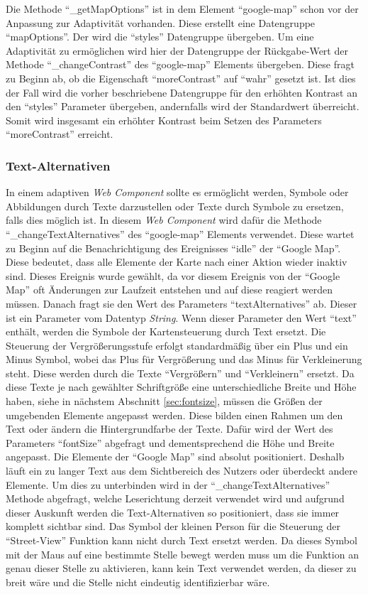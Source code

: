 \documentclass[12pt, paper=a4, bibtotoc, toc=listof, headsepline=true, numbers=endperiod]{scrreprt}
\begin{document}
Die Methode \enquote{\_getMapOptions} ist in dem Element \enquote{google-map} schon vor der Anpassung zur Adaptivität vorhanden. Diese erstellt eine Datengruppe \enquote{mapOptions}. Der wird die \enquote{styles} Datengruppe übergeben. Um eine Adaptivität zu ermöglichen wird hier der Datengruppe der Rückgabe-Wert der Methode \enquote{\_changeContrast} des \enquote{google-map} Elements übergeben. Diese fragt zu Beginn ab, ob die Eigenschaft \enquote{moreContrast} auf \enquote{wahr} gesetzt ist. Ist dies der Fall wird die vorher beschriebene Datengruppe für den erhöhten Kontrast an den \enquote{styles} Parameter übergeben, andernfalls wird der Standardwert überreicht. Somit wird insgesamt ein erhöhter Kontrast beim Setzen des Parameters \enquote{moreContrast} erreicht. 
	\subsubsection{Text-Alternativen}
	In einem adaptiven \emph{Web Component} sollte es ermöglicht werden, Symbole oder Abbildungen durch Texte darzustellen oder Texte durch Symbole zu ersetzen, falls dies möglich ist. In diesem \emph{Web Component} wird dafür die Methode \enquote{\_changeTextAlternatives} des \enquote{google-map} Elements verwendet. Diese wartet zu Beginn auf die Benachrichtigung des Ereignisses \enquote{idle} der \enquote{Google Map}. Diese bedeutet, dass alle Elemente der Karte nach einer Aktion wieder inaktiv sind. Dieses Ereignis wurde gewählt, da vor diesem Ereignis von der \enquote{Google Map} oft Änderungen zur Laufzeit entstehen und auf diese reagiert werden müssen. Danach fragt sie den Wert des Parameters \enquote{textAlternatives} ab. Dieser ist ein Parameter vom Datentyp \emph{String}. Wenn dieser Parameter den Wert \enquote{text} enthält, werden die Symbole der Kartensteuerung durch Text ersetzt. Die Steuerung der Vergrößerungsstufe erfolgt standardmäßig über ein Plus und ein Minus Symbol, wobei das Plus für Vergrößerung und das Minus für Verkleinerung steht. Diese werden durch die Texte \enquote{Vergrößern} und \enquote{Verkleinern} ersetzt. Da diese Texte je nach gewählter Schriftgröße eine unterschiedliche Breite und Höhe haben, siehe in nächstem Abschnitt \ref{sec:fontsize}, müssen die Größen der umgebenden Elemente angepasst werden. Diese bilden einen Rahmen um den Text oder ändern die Hintergrundfarbe der Texte. Dafür wird der Wert des Parameters \enquote{fontSize} abgefragt und dementsprechend die Höhe und Breite angepasst. Die Elemente der \enquote{Google Map} sind absolut positioniert. Deshalb läuft ein zu langer Text aus dem Sichtbereich des Nutzers oder überdeckt andere Elemente. Um dies zu unterbinden wird in der \enquote{\_changeTextAlternatives} Methode abgefragt, welche Leserichtung derzeit verwendet wird und aufgrund dieser Auskunft werden die Text-Alternativen so positioniert, dass sie immer komplett sichtbar sind. Das Symbol der kleinen Person für die Steuerung der \enquote{Street-View} Funktion kann nicht durch Text ersetzt werden. Da dieses Symbol mit der Maus auf eine bestimmte Stelle bewegt werden muss um die Funktion an genau dieser Stelle zu aktivieren, kann kein Text verwendet werden, da dieser zu breit wäre und die Stelle nicht eindeutig identifizierbar wäre. 
\end{document}
